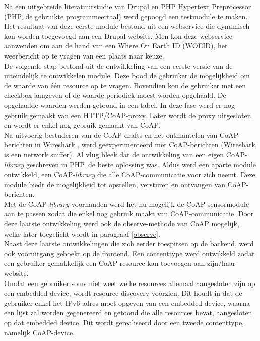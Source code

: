 Na een uitgebreide literatuurstudie van Drupal en PHP Hypertext Preprocessor (PHP, de gebruikte programmeertaal) werd gepoogd een testmodule te maken. Het resultaat van deze eerste module bestond uit een webservice die dynamisch kon worden toegevoegd aan een Drupal website. Men kon deze webservice aanwenden om aan de hand van een Where On Earth ID (WOEID), het weerbericht op te vragen van een plaats naar keuze.\\
De volgende stap bestond uit de ontwikkeling van een eerste versie van de uiteindelijk te ontwikkelen module. Deze bood de gebruiker de mogelijkheid om de waarde van \'{e}\'{e}n resource op te vragen. Bovendien kon de gebruiker met een checkbox aangeven of de waarde periodiek moest worden opgehaald. De opgehaalde waarden werden getoond in een tabel. In deze fase werd er nog gebruik gemaakt van een HTTP/CoAP-proxy. Later wordt de proxy uitgesloten en wordt er enkel nog gebruik gemaakt van CoAP.\\
Na uitvoerig bestuderen van de CoAP-drafts en het ontmantelen van CoAP-berichten in Wireshark \cite{wireshark}, werd ge\"{e}xperimenteerd met CoAP-berichten (Wireshark is een network sniffer). Al vlug bleek dat de ontwikkeling van een eigen CoAP-\textit{library} geschreven in PHP, de beste oplossing was. Aldus werd een aparte module ontwikkeld, een CoAP-\textit{library} die alle CoAP-communicatie voor zich neemt. Deze module biedt de mogelijkheid tot opstellen, versturen en ontvangen van CoAP-berichten.\\
Met de CoAP-\textit{library} voorhanden werd het nu mogelijk de CoAP-sensormodule aan te passen zodat die enkel nog gebruik maakt van CoAP-communicatie. Door deze laatste ontwikkeling werd ook de observe-methode van CoAP mogelijk, welke later toegelicht wordt in paragraaf \ref{observe}.\\
Naast deze laatste ontwikkelingen die zich eerder toespitsen op de backend, werd ook vooruitgang geboekt op de frontend. Een contenttype werd ontwikkeld zodat een gebruiker gemakkelijk een CoAP-resource kan toevoegen aan zijn/haar website.\\
Omdat een gebruiker soms niet weet welke resources allemaal aangesloten zijn op een embedded device, wordt resource discovery voorzien. Dit houdt in dat de gebruiker enkel het IPv6 adres moet opgeven van een embedded device, waarna een lijst zal worden gegenereerd en getoond die alle resources bevat, aangesloten op dat embedded device. Dit wordt gerealiseerd door een tweede contenttype, namelijk CoAP-device.\\
